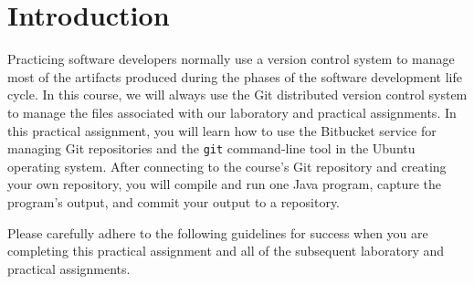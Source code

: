 

\usepackage[compact]{titlesec}



\vspace*{-.2in}
\section*{Introduction}

Practicing software developers normally use a version control system to manage most of the artifacts produced during the
phases of the software development life cycle. In this course, we will always use the Git distributed version control
system to manage the files associated with our laboratory and practical assignments. In this practical assignment, you
will learn how to use the Bitbucket service for managing Git repositories and the {\tt git} command-line tool in the
Ubuntu operating system. After connecting to the course's Git repository and creating your own repository, you will
compile and run one Java program, capture the program's output, and commit your output to a repository.

Please carefully adhere to the following guidelines for success when you are completing this practical assignment and
all of the subsequent laboratory and practical assignments.

